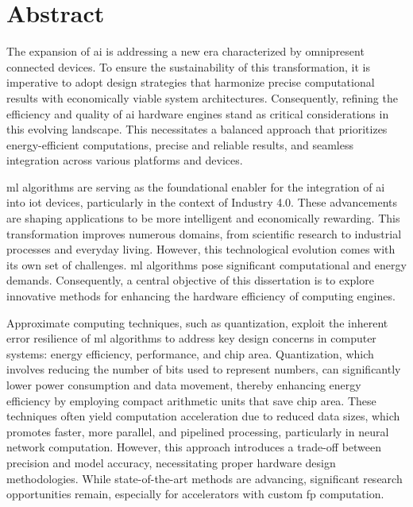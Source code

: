 \chapter*{Abstract}
\thispagestyle{empty}

The expansion of \gls{ai} is addressing a new era characterized by omnipresent connected devices. To ensure the sustainability of this transformation, it is imperative to adopt design strategies that harmonize precise computational results with economically viable system architectures. Consequently, refining the efficiency and quality of \gls{ai} hardware engines stand as critical considerations in this evolving landscape. This necessitates a balanced approach that prioritizes energy-efficient computations, precise and reliable results, and seamless integration across various platforms and devices.

\gls{ml} algorithms are serving as the foundational enabler for the integration of \gls{ai} into \gls{iot} devices, particularly in the context of Industry 4.0. These advancements are shaping applications to be more intelligent and economically rewarding. This transformation improves numerous domains, from scientific research to industrial processes and everyday living. However, this technological evolution comes with its own set of challenges. \gls{ml} algorithms pose significant computational and energy demands. Consequently, a central objective of this dissertation is to explore innovative methods for enhancing the hardware efficiency of computing engines.

Approximate computing techniques, such as quantization, exploit the inherent error resilience of \gls{ml} algorithms to address key design concerns in computer systems: energy efficiency, performance, and chip area. Quantization, which involves reducing the number of bits used to represent numbers, can significantly lower power consumption and data movement, thereby enhancing energy efficiency by employing compact arithmetic units that save chip area. These techniques often yield computation acceleration due to reduced data sizes, which promotes faster, more parallel, and pipelined processing, particularly in neural network computation. However, this approach introduces a trade-off between precision and model accuracy, necessitating proper hardware design methodologies. While state-of-the-art methods are advancing, significant research opportunities remain, especially for accelerators with custom \gls{fp} computation.

